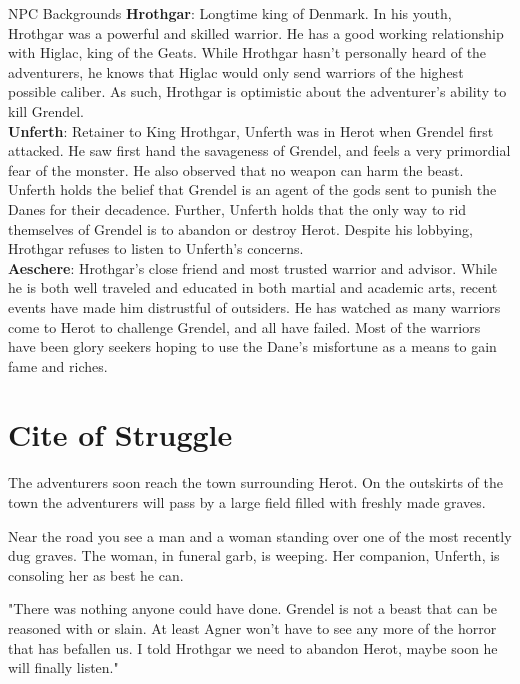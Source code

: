\documentclass[10pt,twoside,twocolumn,openany]{book}
\begin{document}
\begin{commentbox}{NPC Backgrounds}
\textbf{Hrothgar}: Longtime king of Denmark. In his youth, Hrothgar was a powerful and skilled warrior. He has a good working relationship with Higlac, king of the Geats. While Hrothgar hasn't personally heard of the adventurers, he knows that Higlac would only send warriors of the highest possible caliber. As such, Hrothgar is optimistic about the adventurer's ability to kill Grendel.
\\
\textbf{Unferth}: Retainer to King Hrothgar, Unferth was in Herot when Grendel first attacked. He saw first hand the savageness of Grendel, and feels a very primordial fear of the monster. He also observed that no weapon can harm the beast. Unferth holds the belief that Grendel is an agent of the gods sent to punish the Danes for their decadence. Further, Unferth holds that the only way to rid themselves of Grendel is to abandon or destroy Herot. Despite his lobbying, Hrothgar refuses to listen to Unferth's concerns.
\\
\textbf{Aeschere}: Hrothgar's close friend and most trusted warrior and advisor. While he is both well traveled and educated in both martial and academic arts, recent events have made him distrustful of outsiders. He has watched as many warriors come to Herot to challenge Grendel, and all have failed. Most of the warriors have been glory seekers hoping to use the Dane's misfortune as a means to gain fame and riches.
\end{commentbox}

\section{Cite of Struggle}
The adventurers soon reach the town surrounding Herot. On the outskirts of the town the adventurers will pass by a large field filled with freshly made graves.

\begin{quotebox}
Near the road you see a man and a woman standing over one of the most recently dug graves. The woman, in funeral garb, is weeping. Her companion, Unferth, is consoling her as best he can.

"There was nothing anyone could have done. Grendel is not a beast that can be reasoned with or slain. At least Agner won't have to see any more of the horror that has befallen us. I told Hrothgar we need to abandon Herot, maybe soon he will finally listen."
\end{quotebox}
\end{document}
